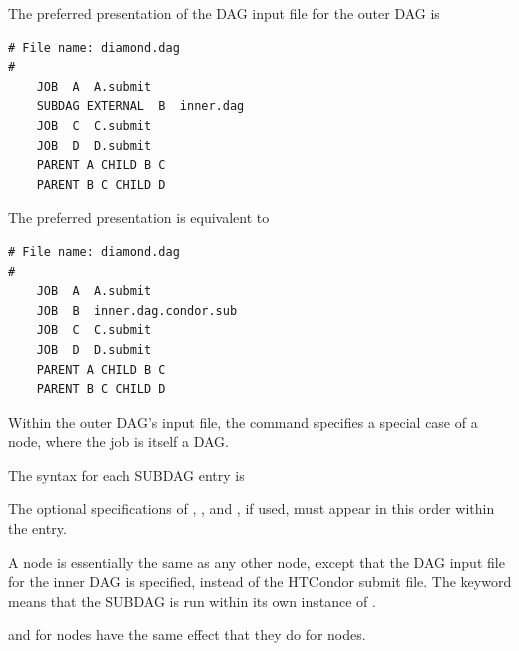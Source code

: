 The preferred presentation of the DAG input file for the outer DAG is
\begin{verbatim}
# File name: diamond.dag
#
    JOB  A  A.submit 
    SUBDAG EXTERNAL  B  inner.dag
    JOB  C  C.submit	
    JOB  D  D.submit
    PARENT A CHILD B C
    PARENT B C CHILD D
\end{verbatim}

The preferred presentation is equivalent to
\begin{verbatim}
# File name: diamond.dag
#
    JOB  A  A.submit 
    JOB  B  inner.dag.condor.sub
    JOB  C  C.submit	
    JOB  D  D.submit
    PARENT A CHILD B C
    PARENT B C CHILD D
\end{verbatim}

Within the outer DAG's input file,
the  command specifies a special case of a 
node, where the job is itself a DAG.

The syntax for each SUBDAG entry is

   
  

The optional specifications of , , and ,
if used, must appear in this order within the entry.

A  node is essentially the same as any other node,
except that the DAG input file for the inner DAG is specified,
instead of the HTCondor submit file.
The keyword  means that the
SUBDAG is run within its own instance of .

 and  for  nodes have the same effect
that they do for  nodes.

